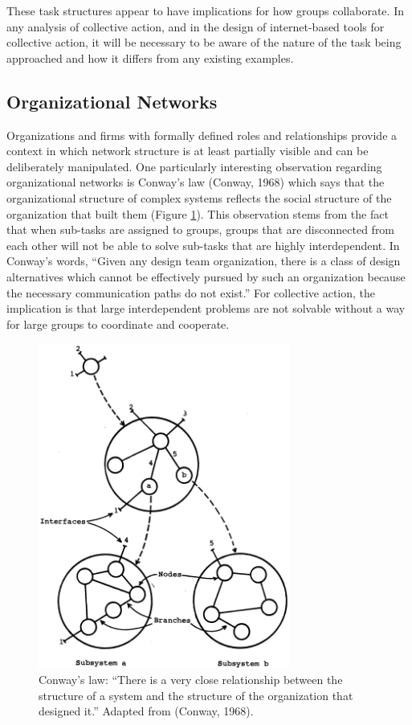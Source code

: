 These task structures appear to have implications for how groups collaborate. In any analysis of collective action, and in the design of internet-based tools for collective action, it will be necessary to be aware of the nature of the task being approached and how it differs from any existing examples.

\subsection{Organizational Networks}
Organizations and firms with formally defined roles and relationships provide a context in which network structure is at least partially visible and can be deliberately manipulated. One particularly interesting observation regarding organizational networks is Conway's law (Conway, 1968) which says that the organizational structure of complex systems reflects the social structure of the organization that built them (Figure \ref{fig:conway}). This observation stems from the fact that when sub-tasks are assigned to groups, groups that are disconnected from each other will not be able to solve sub-tasks that are highly interdependent. In Conway's words, ``Given any design team organization, there is a class of design alternatives which cannot be effectively pursued by such an organization because the necessary communication paths do not exist.'' For collective action, the implication is that large interdependent problems are not solvable without a way for large groups to coordinate and cooperate.

\begin{figure}
\centering
\includegraphics[width=3.25in]{images/fig-conway.png}
\caption{
Conway's law: ``There is a very close relationship between the structure of a system and the structure of the organization that designed it.'' Adapted from (Conway, 1968).
\label{fig:conway}
}
\end{figure}

